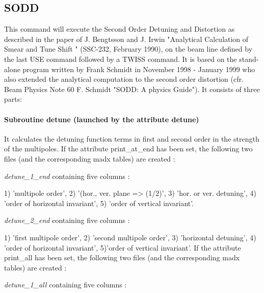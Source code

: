 



\subsection{SODD}

 This command will execute the Second Order Detuning and Distortion as described in the paper of J. Bengtsson and J. Irwin  "Analytical Calculation of Smear and Tune Shift " (SSC-232, February 1990), on the beam line defined by the last USE command followed by a TWISS command. It is based on the stand-alone program written by Frank Schmidt in November 1998 - January 1999 who also extended the analytical computation to the second order distortion (cfr. Beam Physics Note 60 F. Schmidt "SODD: A physics Guide").  It consists of three parts: 



\paragraph{Subroutine detune (launched by the attribute detune)} It calculates the detuning function terms in first and second order in the strength of the multipoles. If the attribute print\_at\_end has been set, the following two files  (and the corresponding madx tables) are created : 

\textit{detune\_1\_end} containing five columns : 

 1) 'multipole order', 2) '(hor., ver. plane => (1/2)',  3) 'hor. or ver. detuning', 4) 'order of horizontal invariant', 5) 'order of vertical invariant'. 


\textit{detune\_2\_end}  containing five columns : 

 1) 'first multipole order', 2) 'second multipole order',  3) 'horizontal detuning', 4) 'order of horizontal invariant', 5)'order of vertical invariant'.  
 If the attribute print\_all has been set, the following two files  (and the corresponding madx tables) are created : 

\textit{detune\_1\_all}  containing  five columns :  

